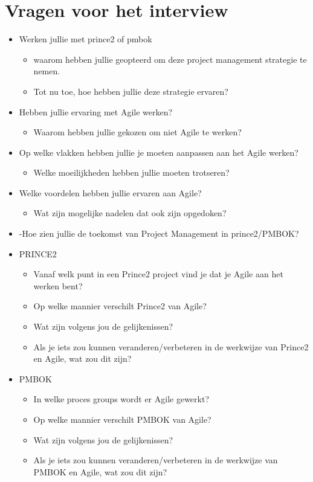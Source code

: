 \documentclass[]{article}
\begin{document}
\section{Vragen voor het interview}
\begin{itemize}
	\item Werken jullie met prince2 of pmbok
	\begin{itemize}
		\item waarom hebben jullie geopteerd om deze project management strategie te nemen.
		\item Tot nu toe, hoe hebben jullie deze strategie ervaren?
	\end{itemize}
		
	\item Hebben jullie ervaring met Agile werken?
	\begin{itemize}
		\item Waarom hebben jullie gekozen om niet Agile te werken?
	\end{itemize}
		
	\item Op welke vlakken hebben jullie je moeten aanpassen aan het Agile werken?
	\begin{itemize}
		\item Welke moeilijkheden hebben jullie moeten trotseren?
	\end{itemize}
		
	\item Welke voordelen hebben jullie ervaren aan Agile?
	\begin{itemize}
		\item Wat zijn mogelijke nadelen dat ook zijn opgedoken?
	\end{itemize}
		
	\item -Hoe zien jullie de toekomst van Project Management in prince2/PMBOK?
	
	\item PRINCE2
	\begin{itemize}
		\item Vanaf welk punt in een Prince2 project vind je dat je Agile aan het werken bent?
		\item Op welke mannier verschilt Prince2 van Agile?
		\item Wat zijn volgens jou de gelijkenissen?
		\item Als je iets zou kunnen veranderen/verbeteren in de werkwijze van Prince2 en Agile, wat zou dit zijn?
	\end{itemize}
		
	\item PMBOK
	\begin{itemize}
		\item In welke proces groups wordt er Agile gewerkt?
		\item Op welke mannier verschilt PMBOK van Agile?
		\item Wat zijn volgens jou de gelijkenissen?
		\item Als je iets zou kunnen veranderen/verbeteren in de werkwijze van PMBOK en Agile, wat zou dit zijn?
	\end{itemize}
		
\end{itemize}
\end{document}
